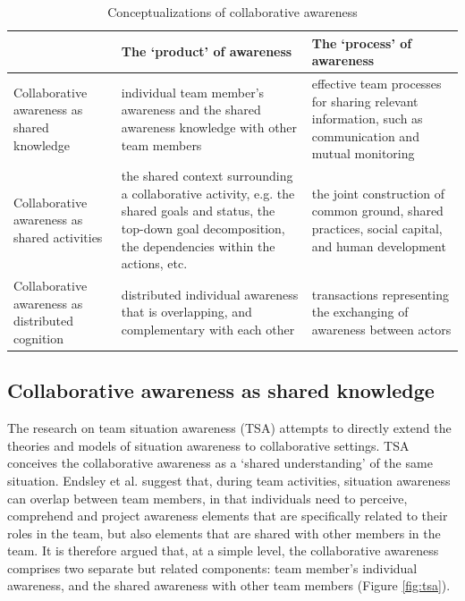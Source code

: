 \begin{table}[htbp]
\centering
\footnotesize
\begin{tabular}{>{\raggedright}p{1.1in}>{\raggedright}p{2.2in}>{\raggedright}p{2.2in}}
   \toprule 
    & \textbf{The `product' of awareness} & \textbf{The `process' of awareness}\tabularnewline
   \midrule 
   Collaborative awareness as shared knowledge & individual team member\textquoteright{}s awareness and the shared
   awareness knowledge with other team members & effective team processes for sharing relevant information, such as
   communication and mutual monitoring\tabularnewline
   \midrule 
   Collaborative awareness as shared activities & the shared context surrounding a collaborative activity, e.g. the shared
   goals and status, the top-down goal decomposition, the dependencies
   within the actions, etc. & the joint construction of common ground, shared practices, social
   capital, and human development\tabularnewline
   \midrule 
   Collaborative awareness as distributed cognition & distributed individual awareness that is overlapping, and complementary
   with each other & transactions representing the exchanging of awareness between actors\tabularnewline
   \bottomrule
\end{tabular}  
\caption{Conceptualizations of collaborative awareness}
\label{tab:collaborative_awareness}
\end{table}

\subsection{Collaborative awareness as shared knowledge} %
\label{sub:team_situation_awareness}
The research on team situation awareness (TSA) attempts to directly extend the theories and models of situation awareness to collaborative settings. TSA conceives the collaborative awareness as a `shared understanding' of the same situation. Endsley et al. \cite{endsley2001model} suggest that, during team activities, situation awareness can overlap between team members, in that individuals need to perceive, comprehend and project awareness elements that are specifically related to their roles in the team, but also elements that are shared with other members in the team. It is therefore argued that, at a simple level, the collaborative awareness comprises two separate but related components: team member's individual awareness, and the shared awareness with other team members (Figure \ref{fig:tsa}). 

